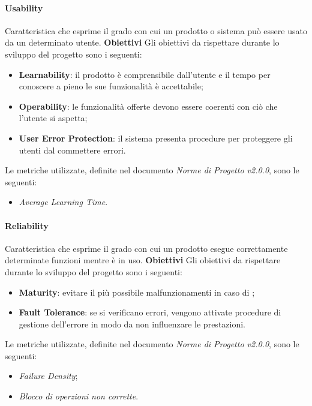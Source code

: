 \paragraph{Usability} \Spazio
	Caratteristica che esprime il grado con cui un prodotto o sistema può essere usato da un determinato utente.\Spazio
	\textbf{Obiettivi} \Spazio
	Gli obiettivi da rispettare durante lo sviluppo del progetto sono i seguenti:
	\begin{itemize}
		\item{\textbf{Learnability}: il prodotto è comprensibile dall'utente e il tempo per conoscere a pieno le sue funzionalità è accettabile;
		}
		\item{\textbf{Operability}: le funzionalità offerte devono essere coerenti con ciò che l'utente si aspetta;
		}
		\item{\textbf{User Error Protection}: il sistema presenta procedure per proteggere gli utenti dal commettere errori.
		}
	\end{itemize}
	Le metriche utilizzate, definite nel documento \emph{Norme di Progetto v2.0.0}, sono le seguenti:
	\begin{itemize}
		\item{\emph{Average Learning Time}.}
	\end{itemize}

\paragraph{Reliability} \Spazio
	Caratteristica che esprime il grado con cui un prodotto esegue correttamente determinate funzioni  mentre è in uso.\Spazio
	\textbf{Obiettivi} \Spazio
	Gli obiettivi da rispettare durante lo sviluppo del progetto sono i seguenti:
	\begin{itemize}
		\item{\textbf{Maturity}: evitare il più possibile malfunzionamenti in caso di ;
		}
		\item{\textbf{Fault Tolerance}: se si verificano errori, vengono attivate procedure di gestione dell'errore in modo da non influenzare le prestazioni.
		}
	\end{itemize}
	Le metriche utilizzate, definite nel documento \emph{Norme di Progetto v2.0.0}, sono le seguenti:
	\begin{itemize}
		\item{\emph{Failure Density};}
		\item{\emph{Blocco di operzioni non corrette}.}
	\end{itemize}

